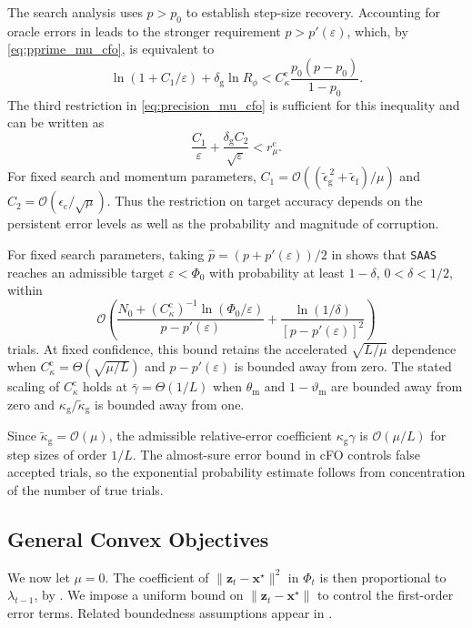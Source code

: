 \documentclass{article}
\begin{document}
\begin{remark}
\label{rem:cfo_progress_margin}
The search analysis uses $p>p_0$ to establish step-size recovery.
Accounting for oracle errors in  leads
to the stronger requirement $p>p'(\varepsilon)$, which, by
\eqref{eq:pprime_mu_cfo}, is equivalent to
\[
\ln(1+C_1/\varepsilon)+\delta_{\mathrm g}\ln R_\phi
<
C_\kappa^{\mathrm c}\frac{p_0(p-p_0)}{1-p_0}.
\]
The third restriction in \eqref{eq:precision_mu_cfo}
is sufficient for this inequality and can be written as
\[
\frac{C_1}{\varepsilon}
+\frac{\delta_{\mathrm g}C_2}{\sqrt{\varepsilon}}
<r_\mu^{\mathrm c}.
\]
For fixed search and momentum parameters,
$C_1=\mathcal{O}((\widetilde\epsilon_{\mathrm g}^{\,2}
+\widetilde\epsilon_{\mathrm f})/\mu)$ and
$C_2=\mathcal{O}(\epsilon_{\mathrm c}/\sqrt{\mu})$.
Thus the restriction on target accuracy depends on the persistent error levels
as well as the probability and magnitude of corruption.

For fixed search parameters, taking
$\hat p=(p+p'(\varepsilon))/2$ in
 shows that \texttt{SAAS} reaches
an admissible target $\varepsilon<\Phi_0$ with probability
at least $1-\delta$, $0<\delta<1/2$, within
\[
\mathcal{O}\!\left(
\frac{N_0+(C_\kappa^{\mathrm c})^{-1}
\ln(\Phi_0/\varepsilon)}
{p-p'(\varepsilon)}
+
\frac{\ln(1/\delta)}
{[p-p'(\varepsilon)]^2}
\right)
\]
trials. At fixed confidence, this bound retains the accelerated
$\sqrt{L/\mu}$ dependence when
$C_\kappa^{\mathrm c}=\Theta(\sqrt{\mu/L})$
and $p-p'(\varepsilon)$ is bounded away from zero.
The stated scaling of $C_\kappa^{\mathrm c}$ holds at
$\bar\gamma=\Theta(1/L)$ when $\theta_{\mathrm m}$
and $1-\vartheta_{\mathrm m}$ are bounded away from zero
and $\kappa_{\mathrm g}/\widetilde\kappa_{\mathrm g}$
is bounded away from one.

Since $\widetilde\kappa_{\mathrm g}=\mathcal{O}(\mu)$,
the admissible relative-error coefficient
$\kappa_{\mathrm g}\gamma$ is $\mathcal{O}(\mu/L)$
for step sizes of order $1/L$.
The almost-sure error bound in cFO controls false accepted trials,
so the exponential probability estimate follows from concentration
of the number of true trials.
\end{remark}

\subsection{General Convex Objectives}\label{sec_mu=0_cons}
We now let $\mu=0$. The coefficient of $\|\bm z_t-\bm x^\star\|^2$ in $\Phi_t$ is then proportional to $\lambda_{t-1}$, by . We impose a uniform bound on $\|\bm z_t-\bm x^\star\|$ to control the first-order error terms. Related boundedness assumptions appear in
\cite{Albert2021,Xie2024}.
\end{document}
